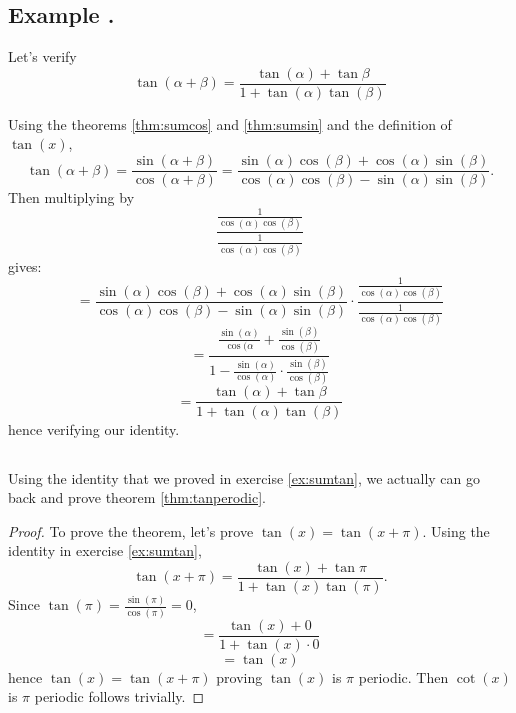 \documentclass[11pt]{article}
\numberwithin{lemma}{section}
\numberwithin{equation}{section}
\numberwithin{define}{section}
\numberwithin{prop}{section}
\numberwithin{figure}{section}
\numberwithin{theorem}{section}
\numberwithin{cor}{section}
\newcounter{ex}[section]
\newenvironment{ex}[0]{

	\refstepcounter{ex}
    \subsection*{Example \theex .}
    }
    {
    \subsection*{}
    }
\numberwithin{ex}{section}
\begin{document}
\begin{ex}
	Let's verify
	$$\tan(\alpha+\beta)=\frac{\tan(\alpha)+\tan{\beta}}{1+\tan(\alpha)\tan(\beta)}$$

	Using the theorems \eqref{thm:sumcos} and \eqref{thm:sumsin} and the definition of $\tan(x)$,
	$$\tan(\alpha+\beta)=\frac{\sin(\alpha+\beta)}{\cos(\alpha+\beta)}
	=\frac{\sin(\alpha)\cos(\beta)+\cos(\alpha)\sin(\beta)}
	{\cos(\alpha)\cos(\beta)-\sin(\alpha)\sin(\beta)}.$$
	Then multiplying by
	$$\frac{\frac{1}{\cos(\alpha)\cos(\beta)}}{\frac{1}{\cos(\alpha)\cos(\beta)}}$$
	gives:
	$$=\frac{\sin(\alpha)\cos(\beta)+\cos(\alpha)\sin(\beta)}
	{\cos(\alpha)\cos(\beta)-\sin(\alpha)\sin(\beta)}\cdot
	\frac{\frac{1}{\cos(\alpha)\cos(\beta)}}{\frac{1}{\cos(\alpha)\cos(\beta)}}$$
	$$=\frac{\frac{\sin(\alpha)}{\cos(\alpha}+\frac{\sin(\beta)}{\cos(\beta)}}
	{1-\frac{\sin(\alpha)}{\cos(\alpha)}\cdot\frac{\sin(\beta)}{\cos(\beta)}}$$
	$$=\frac{\tan(\alpha)+\tan{\beta}}{1+\tan(\alpha)\tan(\beta)}$$
	hence verifying our identity.
	\label{ex:sumtan}
\end{ex}

Using the identity that we proved in exercise \eqref{ex:sumtan}, we actually can go back and prove theorem \eqref{thm:tanperodic}.
\begin{proof}
	To prove the theorem, let's prove $\tan(x)=\tan(x+\pi)$.
	Using the identity in exercise \eqref{ex:sumtan},
	$$\tan(x+\pi)=
	\frac{\tan(x)+\tan{\pi}}{1+\tan(x)\tan(\pi)}.$$
	Since $\tan(\pi)=\frac{\sin(\pi)}{\cos(\pi)}=0$,
	$$=\frac{\tan(x)+0}{1+\tan(x)\cdot 0}$$
	$$=\tan(x)$$
	hence $\tan(x)=\tan(x+\pi)$ proving $\tan(x)$ is $\pi$ periodic. Then $\cot(x)$ is $\pi$ periodic follows trivially.
\end{proof}
\end{document}
